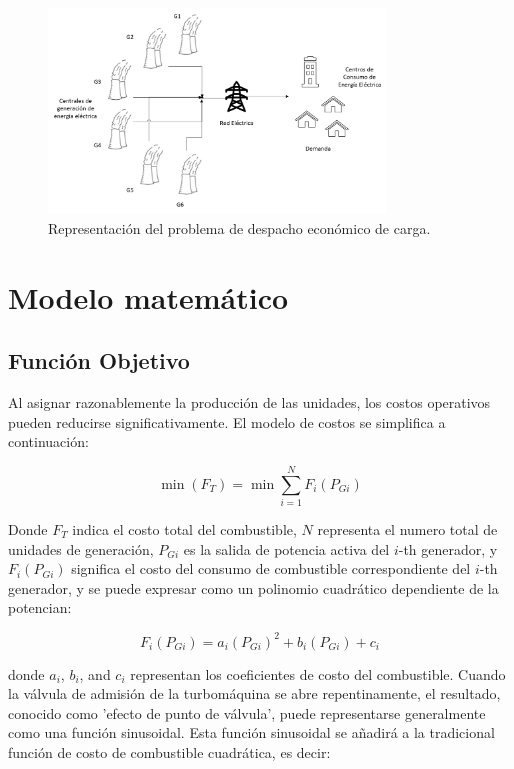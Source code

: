 \documentclass[11pt]{article}
\begin{document}
\begin{figure}[h!]
    \centering
    \includegraphics[width=0.8\textwidth]{economic-dispatch.png}
    \caption{Representación del problema de despacho económico de carga.}
    \label{fig:economic_dispatch}
\end{figure}

\newpage
\section{Modelo matemático}
\subsection{Función Objetivo}

Al asignar razonablemente la producción de las unidades, los costos operativos pueden reducirse significativamente. 
El modelo de costos se simplifica a continuación:

\begin{equation}
    \min (F_T) =\min  \sum_{i=1}^{N} F_i(P_{Gi})
\end{equation}

Donde \( F_T \) indica el costo total del combustible, \( N \) representa el numero total de unidades de generación, 
\( P_{Gi} \) es la salida de potencia activa del \( i \)-th generador, y \( F_i(P_{Gi}) \) significa el costo del consumo 
de combustible correspondiente del \( i \)-th generador, y se puede expresar como un polinomio cuadrático dependiente de 
la potencian:

\begin{equation}
    F_i(P_{Gi}) = a_i(P_{Gi})^2 + b_i(P_{Gi}) + c_i
\end{equation}

donde \( a_i \), \( b_i \), and \( c_i \) representan los coeficientes de costo del combustible. Cuando la válvula de 
admisión de la turbomáquina se abre repentinamente, el resultado, conocido como 'efecto de punto de válvula', 
puede representarse generalmente como una función sinusoidal. Esta función sinusoidal se añadirá a la tradicional 
función de costo de combustible cuadrática, es decir:
\end{document}
